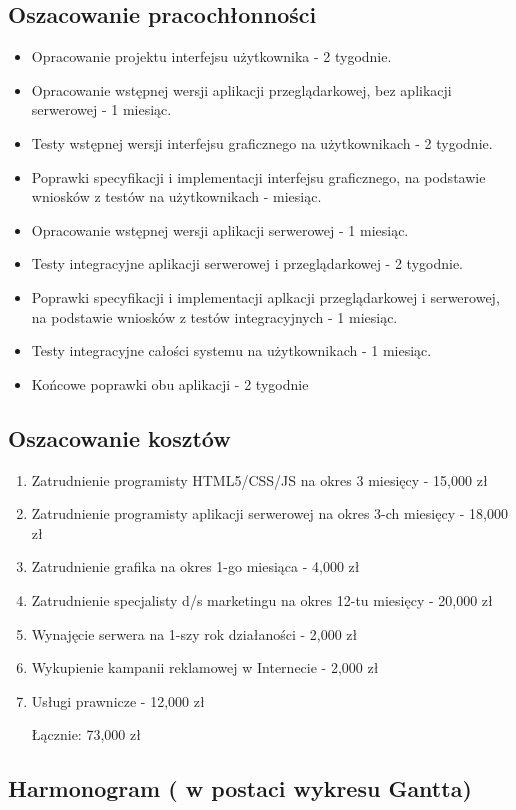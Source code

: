 \documentclass[12pt,a4paper]{report}
\begin{document}
\subsection{Oszacowanie pracochłonności}
\begin{itemize}
	\item Opracowanie projektu interfejsu użytkownika - 2 tygodnie.
	\item Opracowanie wstępnej wersji aplikacji przeglądarkowej, bez aplikacji serwerowej - 1 miesiąc.
	\item Testy wstępnej wersji interfejsu graficznego na użytkownikach - 2 tygodnie.
	\item Poprawki specyfikacji i implementacji interfejsu graficznego, na podstawie wniosków z testów na użytkownikach - miesiąc.
	\item Opracowanie wstępnej wersji aplikacji serwerowej - 1 miesiąc.
	\item Testy integracyjne aplikacji serwerowej i przeglądarkowej - 2 tygodnie.
	\item Poprawki specyfikacji i implementacji aplkacji przeglądarkowej i serwerowej, na podstawie wniosków z testów integracyjnych - 1 miesiąc.
	\item Testy integracyjne całości systemu na użytkownikach - 1 miesiąc.
	\item Końcowe poprawki obu aplikacji - 2 tygodnie 
\end{itemize}
\subsection{Oszacowanie kosztów}
\begin{enumerate}
	\item Zatrudnienie programisty HTML5/CSS/JS na okres 3 miesięcy - 15,000 zł
	\item Zatrudnienie programisty aplikacji serwerowej na okres 3-ch miesięcy - 18,000 zł
	\item Zatrudnienie grafika na okres 1-go miesiąca - 4,000 zł
	\item Zatrudnienie specjalisty d/s marketingu na okres 12-tu miesięcy - 20,000 zł
	\item Wynajęcie serwera na 1-szy rok działaności - 2,000 zł
	\item Wykupienie kampanii reklamowej w Internecie - 2,000 zł
	\item Usługi prawnicze - 12,000 zł

Łącznie: 73,000 zł
\end{enumerate}
\subsection{Harmonogram ( w postaci wykresu Gantta)}
\end{document}
